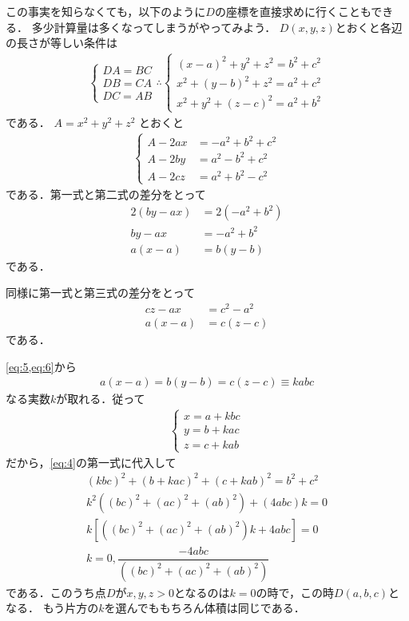 \documentclass[../../main.tex]{subfiles}
\begin{document}
この事実を知らなくても，以下のように$D$の座標を直接求めに行くこともできる．
多少計算量は多くなってしまうがやってみよう．
$D(x,y,z)$とおくと各辺の長さが等しい条件は
\begin{align}
  \begin{cases}
    DA = BC \\
    DB = CA \\
    DC = AB
  \end{cases}
  \therefore
  \begin{cases}
    (x-a)^2 + y^2 + z^2 = b^2 + c^2 \\
    x^2 + (y-b)^2 + z^2 = a^2 + c^2 \\
    x^2 + y^2 + (z-c)^2 = a^2 + b^2
  \end{cases} \label{eq:4}
\end{align}
である．
$A = x^2 + y^2 + z^2$ とおくと
\begin{align}
  \begin{cases}
    A - 2ax &= -a^2 + b^2 + c^2 \\
    A - 2by &= a^2 - b^2 + c^2 \\
    A - 2cz &= a^2 + b^2 - c^2
  \end{cases}
\end{align}
である．第一式と第二式の差分をとって
\begin{align}
  2(by - ax) &= 2(-a^2 + b^2) \\
  by - ax &= -a^2 + b^2 \\
  a(x-a) &= b(y-b)  \label{eq:5}
\end{align}
である．

同様に第一式と第三式の差分をとって
\begin{align}
  cz - ax &= c^2 - a^2 \\
  a(x-a) &= c(z-c) \label{eq:6}
\end{align}
である．

\cref{eq:5,eq:6}から
\begin{align}
  a(x-a) = b(y-b) = c(z-c) \equiv kabc
\end{align}
なる実数$k$が取れる．従って
\begin{align}
  \begin{cases}
    x = a + kbc \\
    y = b + kac \\
    z = c + kab
  \end{cases}
\end{align}
だから，\cref{eq:4}の第一式に代入して
\begin{align}
  (kbc)^2 + (b+kac)^2 + (c+kab)^2 = b^2 + c^2 \\
  k^2\left((bc)^2 + (ac)^2+(ab)^2\right) + (4abc)k = 0 \\
  k \left[\left((bc)^2 + (ac)^2+(ab)^2\right)k + 4abc\right] = 0 \\
  k = 0, \dfrac{-4abc}{\left((bc)^2 + (ac)^2+(ab)^2\right)}
\end{align}
である．このうち点$D$が$x,y,z>0$となるのは$k=0$の時で，この時$D(a,b,c)$となる．
もう片方の$k$を選んでももちろん体積は同じである．

\newpage
\end{document}
